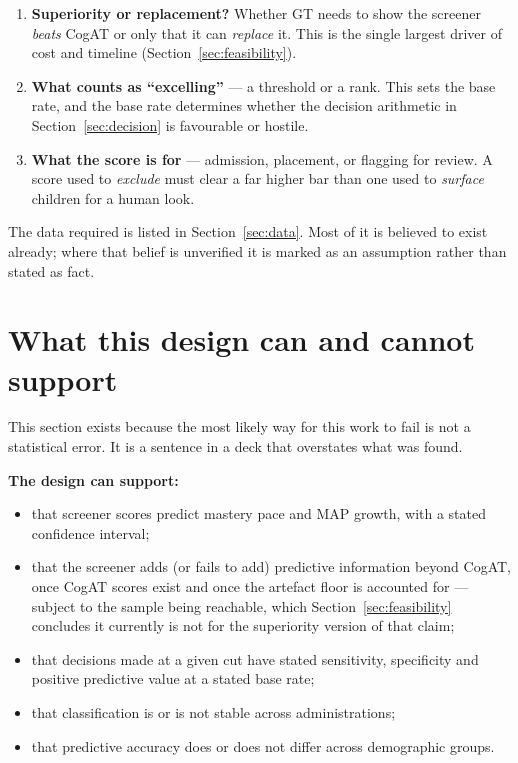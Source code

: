 \documentclass[11pt,a4paper]{article}
\begin{document}
\begin{enumerate}[leftmargin=1.4em,itemsep=0.2em]
\item \textbf{Superiority or replacement?} Whether GT needs to show the screener
\emph{beats} CogAT or only that it can \emph{replace} it. This is the single
largest driver of cost and timeline (Section~\ref{sec:feasibility}).
\item \textbf{What counts as ``excelling''} --- a threshold or a rank. This sets
the base rate, and the base rate determines whether the decision arithmetic in
Section~\ref{sec:decision} is favourable or hostile.
\item \textbf{What the score is for} --- admission, placement, or flagging for
review. A score used to \emph{exclude} must clear a far higher bar than one used
to \emph{surface} children for a human look.
\end{enumerate}

The data required is listed in Section~\ref{sec:data}. Most of it is believed to
exist already; where that belief is unverified it is marked as an assumption
rather than stated as fact.

\section{What this design can and cannot support}
\label{sec:boundaries}

This section exists because the most likely way for this work to fail is not a
statistical error. It is a sentence in a deck that overstates what was found.

\textbf{The design can support:}
\begin{itemize}[leftmargin=1.4em,itemsep=0.15em]
\item that screener scores predict mastery pace and MAP growth, with a stated
confidence interval;
\item that the screener adds (or fails to add) predictive information beyond
CogAT, once CogAT scores exist and once the artefact floor is accounted for ---
subject to the sample being reachable, which Section~\ref{sec:feasibility}
concludes it currently is not for the superiority version of that claim;
\item that decisions made at a given cut have stated sensitivity, specificity
and positive predictive value at a stated base rate;
\item that classification is or is not stable across administrations;
\item that predictive accuracy does or does not differ across demographic
groups.
\end{itemize}
\end{document}

